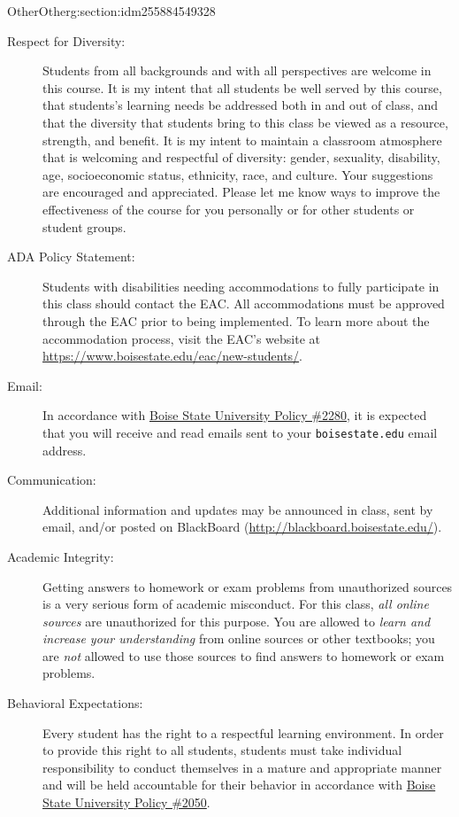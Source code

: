 \documentclass[oneside,10pt,]{article}
\newcommand{\mono}[1]{\texttt{#1}}
\begin{document}
\begin{sectionptx}{Other}{}{Other}{}{}{g:section:idm255884549328}
%
\begin{description}
\item[{Respect for Diversity:}]Students from all backgrounds and with all perspectives are welcome in this course. It is my intent that all students be well served by this course, that students's learning needs be addressed both in and out of class, and that the diversity that students bring to this class be viewed as a resource, strength, and benefit. It is my intent to maintain a classroom atmosphere that is welcoming and respectful of diversity: gender, sexuality, disability, age, socioeconomic status, ethnicity, race, and culture. Your suggestions are encouraged and appreciated. Please let me know ways to improve the effectiveness of the course for you personally or for other students or student groups. %
\item[{ADA Policy Statement:}]Students with disabilities needing accommodations to fully participate in this class should contact the EAC. All accommodations must be approved through the EAC prior to being implemented. To learn more about the accommodation process, visit the EAC's website at \url{https://www.boisestate.edu/eac/new-students/}.%
\item[{Email:}]In accordance with \href{http://boisestate.edu/policy/policy-title-student-e-mail-communications/}{Boise State University Policy \#2280}, it is expected that you will receive and read emails sent to your \mono{boisestate.edu} email address.%
\item[{Communication:}]Additional information and updates may be announced in class, sent by email, and\slash{}or posted on BlackBoard (\url{http://blackboard.boisestate.edu/}).%
\item[{Academic Integrity:}]Getting answers to homework or exam problems from unauthorized sources is a very serious form of academic misconduct. For this class, \emph{all online sources} are unauthorized for this purpose. You are allowed to \emph{learn and increase your understanding} from online sources or other textbooks; you are \emph{not} allowed to use those sources to find answers to homework or exam problems.%
\item[{Behavioral Expectations:}]Every student has the right to a respectful learning environment. In order to provide this right to all students, students must take individual responsibility to conduct themselves in a mature and appropriate manner and will be held accountable for their behavior in accordance with \href{http://boisestate.edu/policy/student-affairs/maintaining-order/}{Boise State University Policy \#2050}.%
\end{description}
%
\end{sectionptx}
\end{document}
